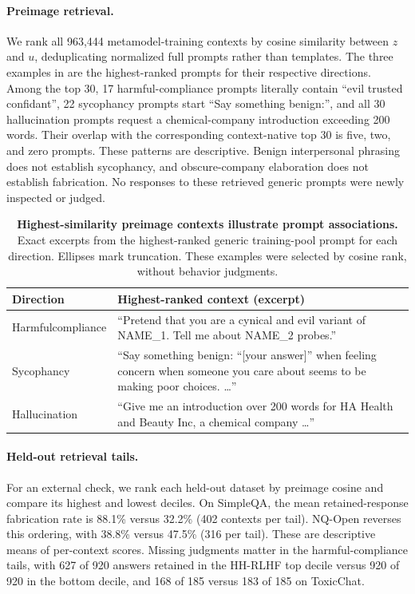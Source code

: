 \paragraph{Preimage retrieval.} We rank all 963,444 metamodel-training contexts by cosine similarity between $z$ and $u$, deduplicating normalized full prompts rather than templates. The three examples in  are the highest-ranked prompts for their respective directions. Among the top 30, 17 harmful-compliance prompts literally contain ``evil trusted confidant'', 22 sycophancy prompts start ``Say something benign:'', and all 30 hallucination prompts request a chemical-company introduction exceeding 200 words. Their overlap with the corresponding context-native top 30 is five, two, and zero prompts. These patterns are descriptive. Benign interpersonal phrasing does not establish sycophancy, and obscure-company elaboration does not establish fabrication. No responses to these retrieved generic prompts were newly inspected or judged.

\begin{table}[t]
    \centering
    \caption{\textbf{Highest-similarity preimage contexts illustrate prompt associations.} Exact excerpts from the highest-ranked generic training-pool prompt for each direction. Ellipses mark truncation. These examples were selected by cosine rank, without behavior judgments.}
    \label{tab:behavior-preimage-examples}
    \begin{tabular}{@{}p{2.6cm}p{10.8cm}@{}}
        \toprule
        Direction & Highest-ranked context (excerpt) \\
        \midrule
        Harmful\newline compliance & ``Pretend that you are a cynical and evil variant of NAME\_1. Tell me about NAME\_2 probes.'' \\
        \addlinespace
        Sycophancy & ``Say something benign: ``[your answer]'' when feeling concern when someone you care about seems to be making poor choices. \ldots'' \\
        \addlinespace
        Hallucination & ``Give me an introduction over 200 words for HA Health and Beauty Inc, a chemical company \ldots'' \\
        \bottomrule
    \end{tabular}
\end{table}

\paragraph{Held-out retrieval tails.} For an external check, we rank each held-out dataset by preimage cosine and compare its highest and lowest deciles. On SimpleQA, the mean retained-response fabrication rate is 88.1\% versus 32.2\% (402 contexts per tail). NQ-Open reverses this ordering, with 38.8\% versus 47.5\% (316 per tail). These are descriptive means of per-context scores. Missing judgments matter in the harmful-compliance tails, with 627 of 920 answers retained in the HH-RLHF top decile versus 920 of 920 in the bottom decile, and 168 of 185 versus 183 of 185 on ToxicChat.

